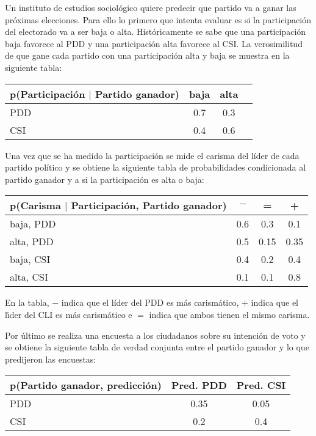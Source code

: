 \ifspanish

\question Un instituto de estudios sociol\'ogico quiere predecir que partido va a ganar las pr\'oximas elecciones. Para ello lo primero que intenta {evaluar} es si la participaci\'on del electorado va a ser baja o alta. Hist\'oricamente se sabe que una participaci\'on baja favorece al PDD y una participaci\'on alta favorece al CSI. La verosimilitud {de} que gane cada partido con una participaci\'on alta y baja se muestra en la siguiente tabla:
\begin{center} 
\begin{tabular}{l|ccc}
p(Participaci\'on $|$ Partido ganador) & baja & alta \\ 
\hline
PDD       & 0.7 & 0.3 \\ 
CSI & 0.4 &  0.6 \\
\end{tabular}
\end{center}

Una vez que se ha medido la participaci\'on se mide el carisma del líder de cada partido político y se obtiene la siguiente tabla de probabilidades condicionada al partido ganador y a si la participaci\'on es alta o baja:
\begin{center} 
\begin{tabular}{l|ccc}
p(Carisma $|$ Participaci\'on, Partido ganador) & $-$ & =& + \\ 
\hline
baja, PDD      & 0.6 & 0.3 & 0.1\\ 
alta, PDD      & 0.5 & 0.15 & 0.35\\ 
baja, CSI      & 0.4 & 0.2 & 0.4\\ 
alta, CSI      & 0.1 & 0.1 & 0.8\\
\end{tabular}
\end{center}

En la tabla, $-$ indica que el líder del PDD es más carismático, $+$ indica que el l{\'\i}der del CLI es m\'as carism\'atico {e} $=$ indica que ambos tienen el mismo carisma.

Por \'ultimo se realiza una encuesta a los ciudadanos sobre su intenci\'on de voto y se obtiene la siguiente tabla de verdad conjunta entre el partido ganador y lo que predijeron las encuestas:
\begin{center} 
\begin{tabular}{l|cc}
p(Partido ganador, predicci\'on) &Pred. PDD & Pred. CSI \\ 
\hline
PDD     & 0.35 & 0.05 \\ 
CSI     & 0.2 & 0.4 \\
\end{tabular}
\end{center}

